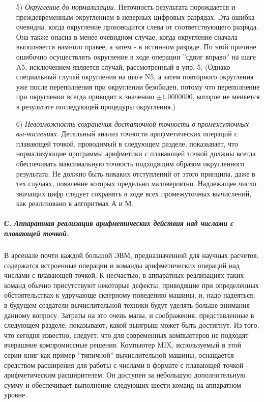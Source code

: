 \begin{enumerate}
\item[5)] \textit{Округление до нормализации.} Неточность результата порождается и преждевременным округлением в неверных цифровых разрядах. Эта ошибка очевидна, когда округление производится слева от соответствующего разряда. Она также опасна в менее очевидном случае, когда округление сначала выполняется намного правее, а затем - в истинном разряде. По этой причине ошибочно осуществлять округление в ходе операции ''сдвиг вправо'' на шаге A5; исключением является случай, рассмотренный в упр. 5. (Однако специальный случай округления на шаге N5, а затем повторного округления уже после переполнения при округлении безобиден, потому что переполнение при округлении всегда приводит к значению $\pm 1.0000000$, которое не меняется в результате последующей процедуры округления.)

\item[6)] \textit{Невозможность сохранения достаточной точности в промежуточных вы-числениях.} Детальный анализ точности арифметических операций с плавающей точкой, проводимый в следующем разделе, показывает, что нормализующие программы арифметики с плавающей точкой должны всегда обеспечивать максимальную точность подходящим образом округленного результата. Не должно быть никаких отступлений от этого принципа, даже в тех случаях, появление которых предельно маловероятно. Надлежащее число значащих цифр следует сохранять в ходе всех промежуточных вычислений, как реализовано в алгоритмах А и М.
\end{enumerate}

\subparagraph{С. Аппаратная реализация арифметических действия над числами с плавающей точкой.} В арсенале почти каждой большой ЭВМ, предназначенной для научных расчетов, содержатся встроенные операции и команды арифметических операций над числами с плавающей точкой. К несчастью, в аппаратных реализациях таких команд обычно присутствуют некоторые дефекты, приводящие при определенных обстоятельствах к удручающе скверному поведению машины, и, надо надеяться, в будущем создатели вычислительной техники будут уделять больше внимания данному вопросу. Затраты на это очень малы, и соображения, представленные в следующем разделе, показывают, какой выигрыш может быть достигнут. Из того, что сегодня известно, следует, что для современных компьютеров не подходят вчерашние компромиссные решения.
Компьютер MIX, используемый в этой серии книг как пример ''типичной'' вычислительной машины, оснащается средством расширения для работы с числами в формате с плавающей точкой - арифметическим расширителем. Он доступен за небольшую дополнительную сумму и обеспечивает выполнение следующих шести команд на аппаратном уровне.

